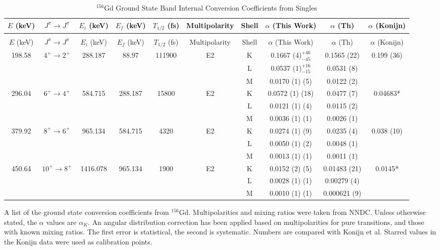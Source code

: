 \begin{landscape}
    \begin{longtable}{c|c|c|c|c|c|c|c|c|c}
    \caption{$^{156}$Gd Ground State Band Internal Conversion Coefficients from Singles}
        \label{tab:156Gd_Single_ICC_GS}\\
    \toprule
$E$ (keV)	&	$J^{\pi}	\rightarrow	J^{\pi}$	&	$E_i$ (keV)	&	$E_f$ (keV)	&	$T_{1/2}$ (fs)	&	Multipolarity	&	Shell & $\alpha$ (This Work)	&	$\alpha$  (Th)	&	$\alpha$ (Konijn)	\\
\hline		
\endfirsthead
    \caption[]{$^{156}$Gd Ground State Band Internal Conversion Coefficients from Singles}\\
    \toprule
$E$ (keV)	&	$J^{\pi}	\rightarrow	J^{\pi}$	&	$E_i$ (keV)	&	$E_f$ (keV)	&	$T_{1/2}$ (fs)	&	Multipolarity	&	Shell & $\alpha$ (This Work)	&	$\alpha$  (Th)	&	$\alpha$ (Konijn)	\\
\hline		
\endhead
198.58	&	$4^+	\rightarrow	2^+$	&	288.187	&	88.97	&	111900	&	E2	& K &	0.1667 (4)$^{+46}_{-45}$	&	0.1565 (22)	&	0.199 (36)	\\
	&				&		&		&		&		& L &	0.0537 (1)$^{+16}_{-15}$	&	0.0531 (8)	&		\\
	&			&		&		&		&		& M &	0.0170 (1) (5)	&	0.0122 (2)	&		\\ \hline
296.04	&	$6^+	\rightarrow	4^+$	&	584.715	&	288.187	&	15800	&	E2 & K	&	0.0572 (1) (18)	&	0.0477 (7)	&	0.04683*	\\
	&				&		&		&		&	& L	&	0.0121 (1) (4)	&	0.0115 (2)	&		\\
	&				&		&		&		&	& M	&	0.0036 (1) (1) &	0.0026 (1)	&		\\ \hline
379.92	&	$8^+	\rightarrow	6^+$	&	965.134	&	584.715	&	4320	&	E2 & K	&		0.0274 (1) (9)	&	0.0235 (4)	&	0.038 (10)	\\
	&				&		&		&		&	& L	&	0.0050 (1) (2)	&	0.0048 (1)	&		\\
	&				&		&		&		&	& M	&	0.0013 (1) (1)	&	0.0011 (1)	&		\\ \hline
450.64	&	$10^+	\rightarrow	8^+$	&	1416.078	&	965.134	&	1900	&	E2	& K &	0.0152 (2) (5)	&	0.01483 (21)	& 0.0145*		\\
	&				&		&		&		&	& L	&	0.0028 (1) (1)	&	0.00279 (4)	&		\\
	&				&		&		&		&	& M	&	0.0010 (1) (1)	&	0.000621 (9)	&		\\ 
\bottomrule
    \end{longtable}
    \caption{A list of the ground state conversion coefficients from $^{156}$Gd. Multipolarities and mixing ratios were taken from NNDC. Unless otherwise stated, the $\alpha$ values are $\alpha_K$. An angular distribution correction has been applied based on multipolarities for pure transitions, and those with known mixing ratios. The first error is statistical, the second is systematic. Numbers are compared with Konijn et al. \citep{konjin81:_156gd} Starred values in the Konijn data were used as calibration points.}
\end{landscape}